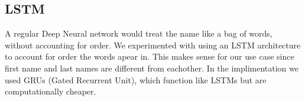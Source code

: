 \subsection{LSTM}
A regular Deep Neural network would treat the name like a bag of words, without accounting for order. We experimented with using an LSTM architecture to account for order the words apear in. This makes sense for our use case since first name and last names are different from eachother. In the implimentation we used GRUs (Gated Recurrent Unit), which function like LSTMs but are computationally cheaper.